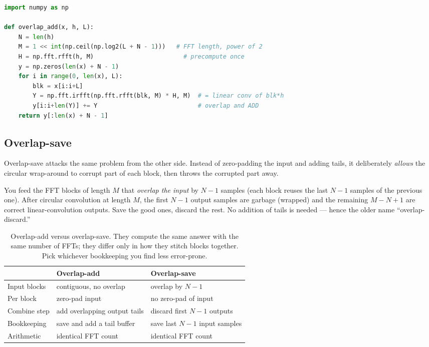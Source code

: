 \begin{lstlisting}[language=Python]
import numpy as np

def overlap_add(x, h, L):
    N = len(h)
    M = 1 << int(np.ceil(np.log2(L + N - 1)))   # FFT length, power of 2
    H = np.fft.rfft(h, M)                         # precompute once
    y = np.zeros(len(x) + N - 1)
    for i in range(0, len(x), L):
        blk = x[i:i+L]
        Y = np.fft.irfft(np.fft.rfft(blk, M) * H, M)  # = linear conv of blk*h
        y[i:i+len(Y)] += Y                            # overlap and ADD
    return y[:len(x) + N - 1]
\end{lstlisting}

\subsection{Overlap-save}
\label{ch17:ols}

Overlap-save attacks the same problem from the other side. Instead of zero-padding
the input and adding tails, it deliberately \emph{allows} the circular
wrap-around to corrupt part of each block, then throws the corrupted part
away.

You feed the FFT blocks of length $M$ that \emph{overlap the input} by $N-1$
samples (each block reuses the last $N-1$ samples of the previous one). After
circular convolution at length $M$, the first $N-1$ output samples are garbage
(wrapped) and the remaining $M-N+1$ are correct linear-convolution outputs. Save
the good ones, discard the rest. No addition of tails is needed --- hence the
older name ``overlap-discard.''

\begin{table}[H]
\centering
\begin{tabular}{@{}lll@{}}
\toprule
 & \textbf{Overlap-add} & \textbf{Overlap-save} \\
\midrule
Input blocks      & contiguous, no overlap        & overlap by $N-1$ \\
Per block         & zero-pad input                & no zero-pad of input \\
Combine step      & add overlapping output tails  & discard first $N-1$ outputs \\
Bookkeeping       & save and add a tail buffer    & save last $N-1$ input samples \\
Arithmetic        & identical FFT count           & identical FFT count \\
\bottomrule
\end{tabular}
\caption{Overlap-add versus overlap-save. They compute the same answer with the
same number of FFTs; they differ only in how they stitch blocks together. Pick
whichever bookkeeping you find less error-prone.}
\label{ch17:tab-ola-ols}
\end{table}

